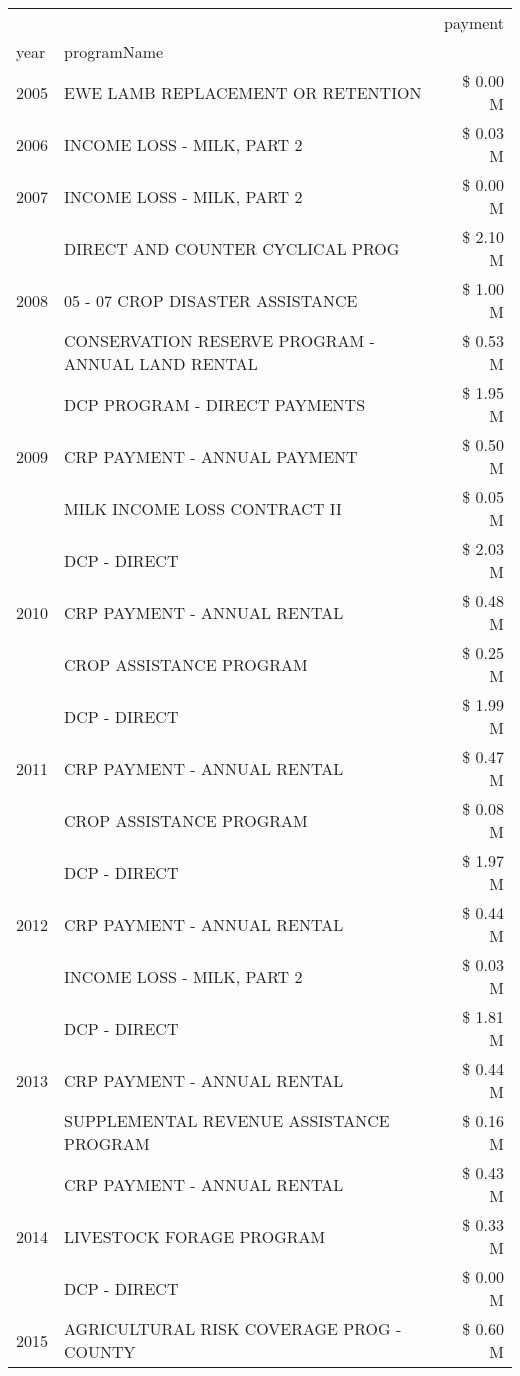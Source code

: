 \begin{tabular}{llr}
\toprule
 &  & payment \\
year & programName &  \\
\midrule
2005 & EWE LAMB REPLACEMENT OR RETENTION & \$ 0.00 M \\
\cline{1-3}
2006 & INCOME LOSS - MILK, PART 2 & \$ 0.03 M \\
\cline{1-3}
2007 & INCOME LOSS - MILK, PART 2 & \$ 0.00 M \\
\cline{1-3}
\multirow[t]{3}{*}{2008} & DIRECT AND COUNTER CYCLICAL PROG & \$ 2.10 M \\
 & 05 - 07 CROP DISASTER ASSISTANCE & \$ 1.00 M \\
 & CONSERVATION RESERVE PROGRAM - ANNUAL LAND RENTAL & \$ 0.53 M \\
\cline{1-3}
\multirow[t]{3}{*}{2009} & DCP PROGRAM - DIRECT PAYMENTS & \$ 1.95 M \\
 & CRP PAYMENT - ANNUAL PAYMENT & \$ 0.50 M \\
 & MILK INCOME LOSS CONTRACT II & \$ 0.05 M \\
\cline{1-3}
\multirow[t]{3}{*}{2010} & DCP - DIRECT & \$ 2.03 M \\
 & CRP PAYMENT - ANNUAL RENTAL & \$ 0.48 M \\
 & CROP ASSISTANCE PROGRAM & \$ 0.25 M \\
\cline{1-3}
\multirow[t]{3}{*}{2011} & DCP - DIRECT & \$ 1.99 M \\
 & CRP PAYMENT - ANNUAL RENTAL & \$ 0.47 M \\
 & CROP ASSISTANCE PROGRAM & \$ 0.08 M \\
\cline{1-3}
\multirow[t]{3}{*}{2012} & DCP - DIRECT & \$ 1.97 M \\
 & CRP PAYMENT - ANNUAL RENTAL & \$ 0.44 M \\
 & INCOME LOSS - MILK, PART 2 & \$ 0.03 M \\
\cline{1-3}
\multirow[t]{3}{*}{2013} & DCP - DIRECT & \$ 1.81 M \\
 & CRP PAYMENT - ANNUAL RENTAL & \$ 0.44 M \\
 & SUPPLEMENTAL REVENUE ASSISTANCE PROGRAM & \$ 0.16 M \\
\cline{1-3}
\multirow[t]{3}{*}{2014} & CRP PAYMENT - ANNUAL RENTAL & \$ 0.43 M \\
 & LIVESTOCK FORAGE PROGRAM & \$ 0.33 M \\
 & DCP - DIRECT & \$ 0.00 M \\
\cline{1-3}
\multirow[t]{3}{*}{2015} & AGRICULTURAL RISK COVERAGE PROG - COUNTY & \$ 0.60 M \\

\end{tabular}

